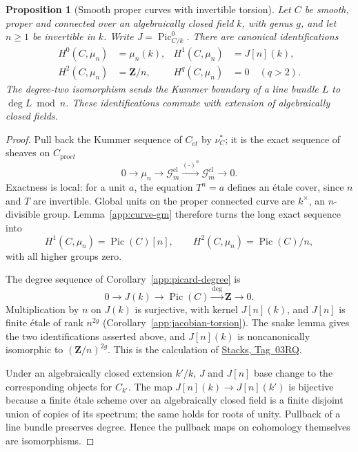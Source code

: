 \documentclass[11pt,a4paper]{article}
\numberwithin{equation}{section}
\newtheorem{proposition}[theorem]{Proposition}
\theoremstyle{definition}
\theoremstyle{remark}
\newcommand{\et}{\acute{e}t}
\newcommand{\proet}{\mathrm{pro}\acute{e}t}
\newcommand{\stacks}[1]{\href{https://stacks.math.columbia.edu/tag/#1}{\textnormal{Stacks, Tag~#1}}}
\newcommand{\Z}{\mathbf Z}
\begin{document}
\begin{proposition}[Smooth proper curves with invertible torsion]
\label{app:curve-kummer}
Let $C$ be smooth, proper and connected over an algebraically closed
field $k$, with genus $g$, and let $n\geq1$ be invertible in $k$.
Write $J=\operatorname{Pic}^0_{C/k}$.  There are canonical
identifications
\[
 \begin{aligned}
 H^0(C,\mu_n)&=\mu_n(k),&
 H^1(C,\mu_n)&=J[n](k),\\
 H^2(C,\mu_n)&=\Z/n,&
 H^q(C,\mu_n)&=0\quad(q>2).
 \end{aligned}
\]
The degree-two isomorphism sends the Kummer boundary of a line bundle
$L$ to $\deg L\bmod n$.  These identifications commute with extension
of algebraically closed fields.
\end{proposition}
\begin{proof}
Pull back the Kummer sequence of $C_{\et}$ by $\nu_C^*$; it is the exact
sequence of sheaves on $C_{\proet}$
\[
 0\longrightarrow\mu_n\longrightarrow\mathcal G_m^{\mathrm{cl}}
 \xrightarrow{(\cdot)^n}\mathcal G_m^{\mathrm{cl}}
 \longrightarrow0.
\]
Exactness is local: for a unit $a$, the equation $T^n=a$ defines an
\'etale cover, since $n$ and $T$ are invertible.  Global units on the
proper connected curve are $k^\times$, an $n$-divisible group.
Lemma~\ref{app:curve-gm} therefore turns the long exact sequence into
\[
 H^1(C,\mu_n)=\operatorname{Pic}(C)[n],\qquad
 H^2(C,\mu_n)=\operatorname{Pic}(C)/n,
\]
with all higher groups zero.

The degree sequence of Corollary~\ref{app:picard-degree} is
\[
 0\longrightarrow J(k)\longrightarrow\operatorname{Pic}(C)
 \xrightarrow{\deg}\Z\longrightarrow0.
\]
Multiplication by $n$ on $J(k)$ is surjective, with kernel $J[n](k)$,
and $J[n]$ is finite \'etale of rank $n^{2g}$
(Corollary~\ref{app:jacobian-torsion}).  The snake lemma gives the two
identifications asserted above, and $J[n](k)$ is noncanonically
isomorphic to $(\Z/n)^{2g}$.  This is the calculation of \stacks{03RQ}.

Under an algebraically closed extension $k'/k$, $J$ and $J[n]$ base
change to the corresponding objects for $C_{k'}$.  The map
$J[n](k)\to J[n](k')$ is bijective because a finite \'etale scheme over
an algebraically closed field is a finite disjoint union of copies of
its spectrum; the same holds for roots of unity.  Pullback of a line
bundle preserves degree.  Hence the pullback maps on cohomology
themselves are isomorphisms.
\end{proof}
\end{document}
